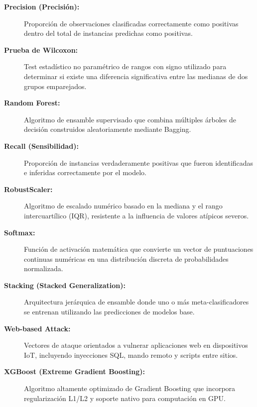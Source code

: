 \begin{description}
    \item[\textbf{Precision (Precisión):}] Proporción de observaciones clasificadas correctamente como positivas dentro del total de instancias predichas como positivas.

    \item[\textbf{Prueba de Wilcoxon:}] Test estadístico no paramétrico de rangos con signo utilizado para determinar si existe una diferencia significativa entre las medianas de dos grupos emparejados.

    \item[\textbf{Random Forest:}] Algoritmo de ensamble supervisado que combina múltiples árboles de decisión construidos aleatoriamente mediante Bagging.

    \item[\textbf{Recall (Sensibilidad):}] Proporción de instancias verdaderamente positivas que fueron identificadas e inferidas correctamente por el modelo.

    \item[\textbf{RobustScaler:}] Algoritmo de escalado numérico basado en la mediana y el rango intercuartílico (IQR), resistente a la influencia de valores atípicos severos.

    \item[\textbf{Softmax:}] Función de activación matemática que convierte un vector de puntuaciones continuas numéricas en una distribución discreta de probabilidades normalizada.

    \item[\textbf{Stacking (Stacked Generalization):}] Arquitectura jerárquica de ensamble donde uno o más meta-clasificadores se entrenan utilizando las predicciones de modelos base.

    \item[\textbf{Web-based Attack:}] Vectores de ataque orientados a vulnerar aplicaciones web en dispositivos IoT, incluyendo inyecciones SQL, mando remoto y scripts entre sitios.

    \item[\textbf{XGBoost (Extreme Gradient Boosting):}] Algoritmo altamente optimizado de Gradient Boosting que incorpora regularización L1/L2 y soporte nativo para computación en GPU.

\end{description}